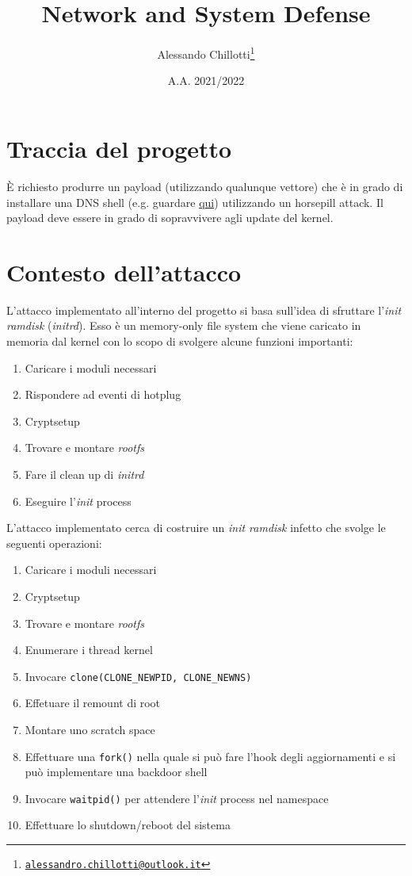 \documentclass[oneside]{article}
\title{Network and System Defense}
\date{A.A. 2021/2022}
\author{Alessando Chillotti\thanks{\texttt{\href{mailto:alessandro.chillotti@outlook.it}{alessandro.chillotti@outlook.it}}}}
\begin{document}
\maketitle
\tableofcontents
\newpage

\section{Traccia del progetto}
È richiesto produrre un payload (utilizzando qualunque vettore) che è in grado di installare una DNS shell (e.g. guardare \href{https://github.com/sensepost/DNS-Shell}{qui}) utilizzando un horsepill attack. Il payload deve essere in grado di sopravvivere agli update del kernel.

\section{Contesto dell'attacco}
L'attacco implementato all'interno del progetto si basa sull'idea di sfruttare l'\textit{init ramdisk} (\textit{initrd}). Esso è un memory-only file system che viene caricato in memoria dal kernel con lo scopo di svolgere alcune funzioni importanti:
\begin{multicols}{2}
\begin{enumerate}
\item Caricare i moduli necessari
\item Rispondere ad eventi di hotplug
\item Cryptsetup
\item Trovare e montare \textit{rootfs}
\item Fare il clean up di \textit{initrd}
\item Eseguire l'\textit{init} process
\end{enumerate}
\end{multicols}

L'attacco implementato cerca di costruire un \textit{init ramdisk} infetto che svolge le seguenti operazioni:
\begin{multicols}{2}
\begin{enumerate}
\item Caricare i moduli necessari
\item Cryptsetup
\item Trovare e montare \textit{rootfs}
\item Enumerare i thread kernel
\item Invocare \texttt{clone(CLONE\_NEWPID, CLONE\_NEWNS)}
\item Effetuare il remount di root
\item Montare uno scratch space
\item Effettuare una \texttt{fork()} nella quale si può fare l'hook degli aggiornamenti e si può implementare una backdoor shell
\item Invocare \texttt{waitpid()} per attendere l'\textit{init} process nel namespace
\item Effettuare lo shutdown/reboot del sistema
\end{enumerate}
\end{multicols}
\end{document}

